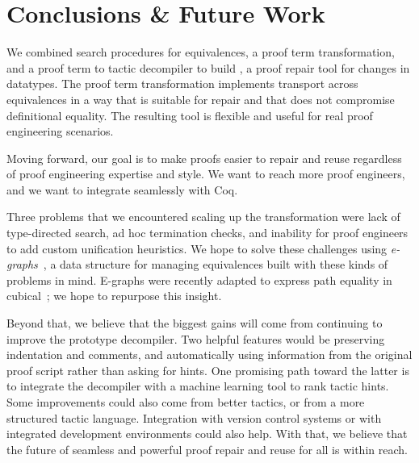 \section{Conclusions \& Future Work}
\label{sec:discussion}

We combined search procedures for equivalences, a proof term transformation,
and a proof term to tactic decompiler to build \toolname,
a proof repair tool for changes in datatypes.
The proof term transformation implements transport across equivalences in a way that is suitable for repair
and that does not compromise definitional equality.
The resulting tool is flexible and useful for real proof engineering scenarios.



Moving forward, our goal is to make proofs easier to repair and reuse regardless of proof engineering expertise and style.
We want to reach more proof engineers, and we want \toolname to integrate seamlessly with Coq.

Three problems that we encountered scaling up the \toolname transformation were lack of type-directed search,
ad hoc termination checks, and inability for proof engineers to add custom unification heuristics.
We hope to solve these challenges using \textit{e-graphs}~\cite{egraph1},
a data structure %
for managing equivalences
built with these kinds of problems in mind.
E-graphs were recently adapted to express path equality in cubical~\cite{egraph6}; we hope to repurpose this insight.

Beyond that, we believe that the biggest gains will come from continuing to improve the prototype decompiler.
Two helpful features would be preserving indentation and comments, and automatically using information from the original proof script rather than asking for hints.
One promising path toward the latter is to integrate the decompiler with a machine learning tool to rank tactic hints.
Some improvements could also come from better tactics,
or from a more structured tactic language.
Integration with version control systems or with integrated development environments could also help.
With that, we believe that the future of seamless and powerful proof repair and reuse for all is within reach.


